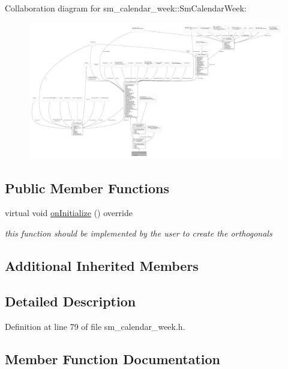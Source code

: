 Collaboration diagram for sm\+\_\+calendar\+\_\+week\+:\+:Sm\+Calendar\+Week\+:
\nopagebreak
\begin{figure}[H]
\begin{center}
\leavevmode
\includegraphics[width=350pt]{structsm__calendar__week_1_1SmCalendarWeek__coll__graph}
\end{center}
\end{figure}
\subsection*{Public Member Functions}
\begin{DoxyCompactItemize}
\item 
virtual void \hyperlink{structsm__calendar__week_1_1SmCalendarWeek_a4c01af9a3190d10d3794e82bd087e121}{on\+Initialize} () override
\begin{DoxyCompactList}\small\item\em this function should be implemented by the user to create the orthogonals \end{DoxyCompactList}\end{DoxyCompactItemize}
\subsection*{Additional Inherited Members}


\subsection{Detailed Description}


Definition at line 79 of file sm\+\_\+calendar\+\_\+week.\+h.



\subsection{Member Function Documentation}
